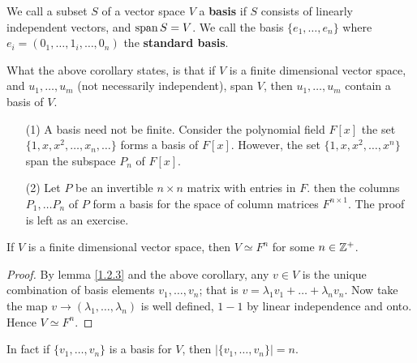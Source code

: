 \begin{definition}
    We call a subset $S$ of a vector space  $V$ a \textbf{basis} if $S$
    consists of linearly independent vectors, and $\operatorname{span}{S}=V$. We call the basis 
    $\{e_1, \dots, e_n\}$ where $e_i=(0_1, \dots, 1_i, \dots, 0_n)$ the \textbf{standard
    basis}.
\end{definition}

What the above corollary states, is that if $V$ is a finite dimensional vector
space, and  $ u_1, \dots, u_m$ (not necessarily independent), span $V$, then  $
u_1, \dots, u_m$ contain a basis of $V$. 

\begin{example}
    \begin{enumerate}
        \item[(1)] A basis need not be finite. Consider the polynomial field  $F[x]$ 
            the set  $\{1,x,x^2, \dots, x_n, \dots\}$ forms a basis of $F[x]$. 
            However, the set $\{1, x, x^2, \dots, x^n\}$ span the subspace $P_n$ of  
            $F[x]$.

        \item[(2)] Let $P$ be an invertible  $n \times n$ matrix with entries in  $F$. 
            then the columns  $P_1, \dots P_n$ of $P$ form a basis for the space of 
            column matrices  $F^{n \times 1}$. The proof is left as an exercise.
    \end{enumerate}
\end{example} 

\begin{lemma}
    If $V$ is a finite dimensional vector space, then  $V \simeq F^n$ for some
    $n \in \mathbb{Z}^+$.
\end{lemma}
\begin{proof}
    By lemma \ref{1.2.3} and the above corollary, any $v \in V$ is the unique
    combination of basis elements  $ v_1, \dots, v_n$; that is
    $v=\lambda_1v_1+\dots+\lambda_nv_n$. Now take the map $v \rightarrow
    (\lambda_1, \dots, \lambda_n)$ is well defined, $1-1$ by linear independence
    and onto. Hence  $V \simeq F^n$.
\end{proof}
\begin{remark} 
    In fact if $\{v_1, \dots, v_n\}$ is a basis for $V$, then  $|\{v_1, \dots,
    v_n\}|=n$.
\end{remark}

